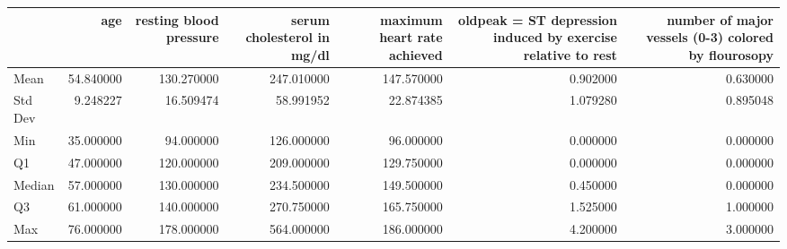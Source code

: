 \begin{tabular}{lrrrrrr}
\toprule
 & age & resting blood pressure & serum cholesterol in mg/dl & maximum heart rate achieved & oldpeak = ST depression induced by exercise relative to rest & number of major vessels (0-3) colored by flourosopy \\
\midrule
Mean & 54.840000 & 130.270000 & 247.010000 & 147.570000 & 0.902000 & 0.630000 \\
Std Dev & 9.248227 & 16.509474 & 58.991952 & 22.874385 & 1.079280 & 0.895048 \\
Min & 35.000000 & 94.000000 & 126.000000 & 96.000000 & 0.000000 & 0.000000 \\
Q1 & 47.000000 & 120.000000 & 209.000000 & 129.750000 & 0.000000 & 0.000000 \\
Median & 57.000000 & 130.000000 & 234.500000 & 149.500000 & 0.450000 & 0.000000 \\
Q3 & 61.000000 & 140.000000 & 270.750000 & 165.750000 & 1.525000 & 1.000000 \\
Max & 76.000000 & 178.000000 & 564.000000 & 186.000000 & 4.200000 & 3.000000 \\
\bottomrule
\end{tabular}
